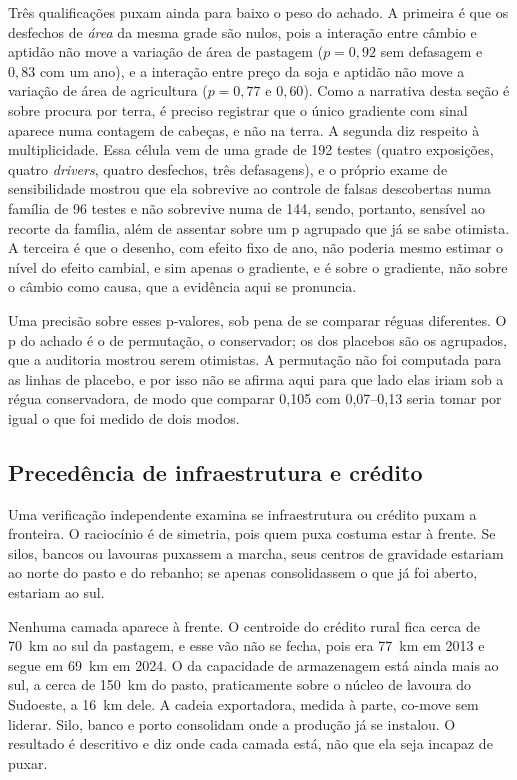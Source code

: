 Três qualificações puxam ainda para baixo o peso do achado. A primeira é que os
desfechos de \emph{área} da mesma grade são nulos, pois a interação entre câmbio e
aptidão não move a variação de área de pastagem ($p = 0{,}92$ sem defasagem e
$0{,}83$ com um ano), e a interação entre preço da soja e aptidão não move a
variação de área de agricultura ($p = 0{,}77$ e $0{,}60$). Como a narrativa
desta seção é sobre procura por terra, é preciso registrar que o único
gradiente com sinal aparece numa contagem de cabeças, e não na terra. A
segunda diz respeito à multiplicidade. Essa célula vem de uma grade de 192
testes (quatro exposições, quatro \emph{drivers}, quatro desfechos, três
defasagens), e o próprio exame de sensibilidade mostrou que ela sobrevive ao
controle de falsas descobertas numa família de 96 testes e não sobrevive numa
de 144, sendo, portanto, sensível ao recorte da família, além de assentar
sobre um p agrupado que já se sabe otimista. A terceira é que o desenho, com
efeito fixo de ano, não poderia mesmo estimar o nível do efeito cambial, e sim
apenas o gradiente, e é sobre o gradiente, não sobre o câmbio como causa, que
a evidência aqui se pronuncia.

Uma precisão sobre esses p-valores, sob pena de se comparar réguas diferentes.
O p do achado é o de permutação, o conservador; os dos placebos são os
agrupados, que a auditoria mostrou serem otimistas. A permutação não foi
computada para as linhas de placebo, e por isso não se afirma aqui para que
lado elas iriam sob a régua conservadora, de modo que comparar 0,105 com
0,07--0,13 seria tomar por igual o que foi medido de dois modos.

\subsection{Precedência de infraestrutura e crédito}

Uma verificação independente examina se infraestrutura ou crédito puxam a
fronteira. O raciocínio é de simetria, pois quem puxa costuma estar à frente. Se
silos, bancos ou lavouras puxassem a marcha, seus centros de gravidade
estariam ao norte do pasto e do rebanho; se apenas consolidassem o que já
foi aberto, estariam ao sul.

Nenhuma camada aparece à frente. O centroide do crédito rural fica cerca de
70~km ao sul da pastagem, e esse vão não se fecha, pois era 77~km em 2013 e
segue em 69~km em 2024. O da capacidade de armazenagem está ainda mais ao
sul, a cerca de 150~km do pasto, praticamente sobre o núcleo de lavoura do
Sudoeste, a 16~km dele. A cadeia exportadora, medida à parte, co-move sem
liderar. Silo, banco e porto consolidam onde a produção já se instalou. O
resultado é descritivo e diz onde cada camada está, não que ela seja incapaz
de puxar.

